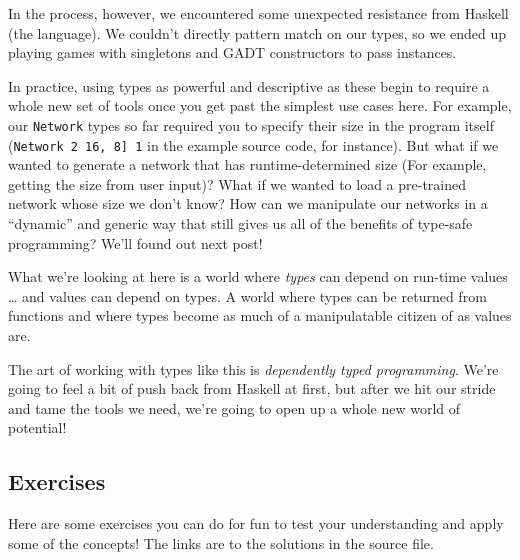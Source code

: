 \documentclass[]{article}
\begin{document}
In the process, however, we encountered some unexpected resistance from Haskell
(the language). We couldn't directly pattern match on our types, so we ended up
playing games with singletons and GADT constructors to pass instances.

In practice, using types as powerful and descriptive as these begin to require a
whole new set of tools once you get past the simplest use cases here. For
example, our \texttt{Network} types so far required you to specify their size in
the program itself (\texttt{Network\ 2\ \textquotesingle{}{[}16,\ 8{]}\ 1} in
the example source code, for instance). But what if we wanted to generate a
network that has runtime-determined size (For example, getting the size from
user input)? What if we wanted to load a pre-trained network whose size we don't
know? How can we manipulate our networks in a ``dynamic'' and generic way that
still gives us all of the benefits of type-safe programming? We'll found out
next post!

What we're looking at here is a world where \emph{types} can depend on run-time
values \ldots{} and values can depend on types. A world where types can be
returned from functions and where types become as much of a manipulatable
citizen of as values are.

The art of working with types like this is \emph{dependently typed programming}.
We're going to feel a bit of push back from Haskell at first, but after we hit
our stride and tame the tools we need, we're going to open up a whole new world
of potential!

\hypertarget{exercises}{%
\subsection{Exercises}\label{exercises}}

Here are some exercises you can do for fun to test your understanding and apply
some of the concepts! The links are to the solutions in the source file.
\end{document}
